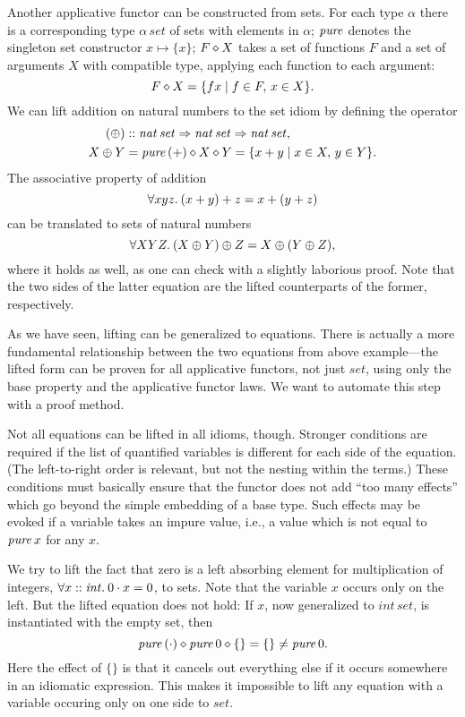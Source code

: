 \begin{example}\label{exmp:set-intro}
Another applicative functor can be constructed from sets.
For each type $\alpha$ there is a corresponding type $\alpha\,\mathit{set}$
of sets with elements in $\alpha$;
$\operatorname{\mathit{pure}}$ denotes the singleton set constructor $x \mapsto \{x\}$;
$F \diamond X$ takes a set of functions $F$ and a set of arguments $X$
with compatible type, applying each function to each argument:
\[ F \diamond X = \{f x\mid f \in F,\, x \in X\}. \]
We can lift addition on natural numbers to the set idiom by defining the operator
\begin{align*}
	(\oplus) &\mathrel{::} \mathit{nat}\,\mathit{set} \Rightarrow \mathit{nat}\,\mathit{set} \Rightarrow
		\mathit{nat}\,\mathit{set}, \\
	X \oplus Y &= \operatorname{\mathit{pure}}{(+)} \diamond X \diamond Y = \{x + y\mid x \in X,\, y \in Y\}.
\end{align*}
The associative property of addition
\[ \forall x y z.\>(x + y) + z = x + (y + z) \]
can be translated to sets of natural numbers
\[ \forall X Y Z.\>(X \oplus Y) \oplus Z = X \oplus (Y \oplus Z), \]
where it holds as well, as one can check with a slightly laborious proof.
Note that the two sides of the latter equation are the lifted counterparts
of the former, respectively.
\end{example}

As we have seen, lifting can be generalized to equations.
There is actually a more fundamental relationship between the two equations
from above example---the lifted form can be proven for all applicative
functors, not just $\mathit{set}$, using only the base property and the
applicative functor laws.
We want to automate this step with a proof method.

Not all equations can be lifted in all idioms, though.
Stronger conditions are required if the list of quantified variables is
different for each side of the equation.
(The left-to-right order is relevant, but not the nesting within the terms.)
These conditions must basically ensure that the functor does not add ``too many
effects'' which go beyond the simple embedding of a base type.
Such effects may be evoked if a variable takes an impure value, i.e., a value
which is not equal to $\operatorname{\mathit{pure}} x$ for any $x$.

\begin{example}\label{exmp:set-counterexmp}
We try to lift the fact that zero is a left absorbing element for
multiplication of integers, $\forall x \mathrel{::} \mathit{int}.\>0 \cdot x = 0$,
to sets.
Note that the variable $x$ occurs only on the left.
But the lifted equation does not hold: If $x$, now generalized to
$\mathit{int}\,\mathit{set}$, is instantiated with the empty set, then
\[ \operatorname{\mathit{pure}}{(\cdot)} \diamond \operatorname{\mathit{pure}} 0 \diamond \{\} = \{\} \ne \operatorname{\mathit{pure}} 0. \]
Here the effect of $\{\}$ is that it cancels out everything else if it occurs
somewhere in an idiomatic expression.
This makes it impossible to lift any equation with a variable occuring only on
one side to $\mathit{set}$.
\end{example}

